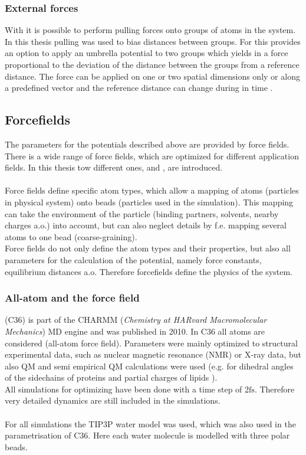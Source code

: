 \subsubsection{External forces}
With \gromacs{} it is possible to perform pulling forces onto groups of atoms in the system. In this thesis pulling was used to bias distances between groups. For this \gromacs{} provides an option to apply an umbrella potential to two groups which yields in a force proportional to the deviation of the distance between the groups from a reference distance. The force can be applied on one or two spatial dimensions only or along a predefined vector and the reference distance can change during in time  \autocite[p. 154-159]{gromacsManual}.
\subsection{Forcefields}
The parameters for the potentials described above are provided by force fields. There is a wide range of force fields, which are optimized for different application fields. In this thesis tow different ones, \charmm{} and \martini{}, are introduced.\\
\\
Force fields define specific atom types, which allow a mapping of atoms (particles in physical system) onto beads (particles used in the simulation). This mapping can take the environment of the particle (binding partners, solvents, nearby charges a.o.) into account, but can also neglect details by f.e. mapping several atoms to one bead (coarse-graining).\\
Force fields do not only define the atom types and their properties, but also all parameters for the calculation of the potential, namely force constants, equilibrium distances a.o. Therefore forcefields define the physics of the system.
\subsubsection{All-atom and the \charmm{} force field}
\charmm{} \autocites{charmm36_protein}{charmm36_lipids} (C36) is part of the CHARMM (\textit{Chemistry at HARvard Macromolecular Mechanics}) MD engine and was published in 2010. In C36 all atoms are considered (all-atom force field). Parameters were mainly optimized to structural experimental data, such as nuclear magnetic resonance (NMR) or X-ray data, but also QM and semi empirical QM calculations were used (e.g. for dihedral angles of the sidechains of proteins \autocite{charmm36_protein} and partial charges of lipids \autocite{charmm36_lipids}).\\
All simulations for optimizing have been done with a time step of 2$\si{\femto\second}$. Therefore very detailed dynamics are still included in the simulations.\\
\\
For all simulations the TIP3P water model \autocite{tip3p} was used, which was also used in the parametrisation of C36. Here each water molecule is modelled with three polar beads.
